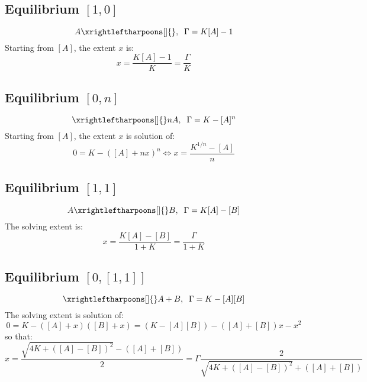 \documentclass[aps,12pt]{revtex4}
\begin{document}
\subsection{Equilibrium $[1,0]$}
\begin{equation}
	A \xrightleftharpoons[]{} , \;\; \Gamma = K[A]-1
\end{equation}
Starting from $[A]$, the extent $x$ is:
\begin{equation}
	x = \dfrac{K[A]-1}{K} = \dfrac{\Gamma}{K}
\end{equation}

\subsection{Equilibrium $[0,n]$}
\begin{equation}
	\xrightleftharpoons[]{} n A, \;\; \Gamma = K - [A]^n
\end{equation}
Starting from $[A]$, the extent $x$ is solution of:
\begin{equation}
	0 = K-([A]+nx)^n \Leftrightarrow x = \dfrac{K^{1/n} - [A]}{n}
\end{equation}



\subsection{Equilibrium $[1,1]$}

\begin{equation}
	A \xrightleftharpoons[]{} B, \;\; \Gamma = K[A] - [B]
\end{equation}
The solving extent is:
\begin{equation}
	x = \dfrac{K[A]-[B]}{1+K} = \dfrac{\Gamma}{1+K}
\end{equation}

\subsection{Equilibrium $[0,[1,1]]$}
\begin{equation}
	\xrightleftharpoons[]{} A+B, \;\; \Gamma = K - [A][B]
\end{equation}
The solving extent is solution of:
\begin{equation}
	0 = K - ([A]+x)([B]+x) = (K - [A][B]) - ([A]+[B]) x - x^2
\end{equation}
so that:
\begin{equation}
	x = \dfrac{\sqrt{4K+([A]-[B])^2} - ([A]+[B])}{2} = \Gamma \dfrac{2}{\sqrt{4K+([A]-[B])^2} + ([A]+[B])}
\end{equation}
\end{document}
